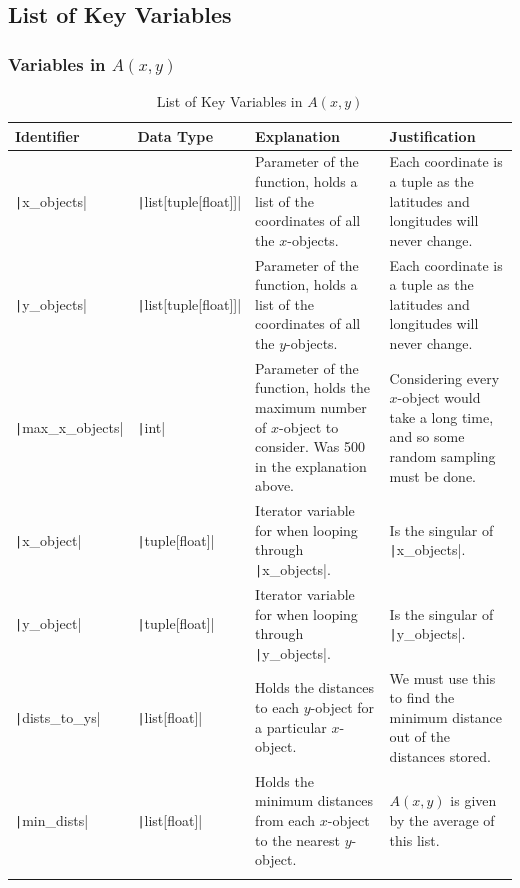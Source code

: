 \documentclass[12pt]{report}
\newcommand{\pil}[1]{\texttt|#1|}
\begin{document}
\subsection{List of Key Variables}
\subsubsection{Variables in $A\left(x,y\right)$}
\begin{center}
\begin{longtable}{ | m{3cm} | m{4cm}| m{4cm} | m{4cm} |} 
    \hline
    \textbf{Identifier} & \textbf{Data Type} & \textbf{Explanation}  & \textbf{Justification} \\ 
    \hline
    \pil{x_objects} & \pil{list[tuple[float]]} & Parameter of the function, holds a list of the coordinates of all the $x$-objects. & Each coordinate is a tuple as the latitudes and longitudes will never change. \\ 
    \hline
    \pil{y_objects} & \pil{list[tuple[float]]} & Parameter of the function, holds a list of the coordinates of all the $y$-objects. & Each coordinate is a tuple as the latitudes and longitudes will never change. \\ 
    \hline
    \pil{max_x_objects} & \pil{int} & Parameter of the function, holds the maximum number of $x$-object to consider. Was 500 in the explanation above. & Considering every $x$-object would take a long time, and so some random sampling must be done. \\ 
    \hline
    \pil{x_object} & \pil{tuple[float]} & Iterator variable for when looping through \pil{x_objects}. & Is the singular of \pil{x_objects}. \\ 
    \hline
    \pil{y_object} & \pil{tuple[float]} & Iterator variable for when looping through \pil{y_objects}. & Is the singular of \pil{y_objects}. \\ 
    \hline
    \pil{dists_to_ys} & \pil{list[float]} & Holds the distances to each $y$-object for a particular $x$-object. & We must use this to find the minimum distance out of the distances stored. \\ 
    \hline
    \pil{min_dists} & \pil{list[float]} & Holds the minimum distances from each $x$-object to the nearest $y$-object. & $A\left(x,y\right)$ is given by the average of this list. \\ 
    \hline
\caption{List of Key Variables in $A\left(x,y\right)$}
\end{longtable}
\end{center}
\end{document}
